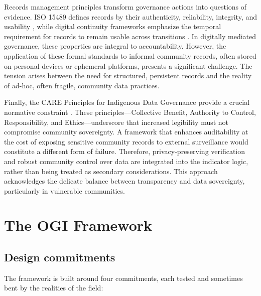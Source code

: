 \documentclass[sigconf,anonymous]{acmart}
\begin{document}
Records management principles transform governance actions into questions of evidence. ISO 15489 defines records by their authenticity, reliability, integrity, and usability \cite{iso2016}, while digital continuity frameworks emphasize the temporal requirement for records to remain usable across transitions \cite{lemieux2016}. In digitally mediated governance, these properties are integral to accountability. However, the application of these formal standards to informal community records, often stored on personal devices or ephemeral platforms, presents a significant challenge. The tension arises between the need for structured, persistent records and the reality of ad-hoc, often fragile, community data practices.

Finally, the CARE Principles for Indigenous Data Governance provide a crucial normative constraint \cite{carroll2020}. These principles—Collective Benefit, Authority to Control, Responsibility, and Ethics—underscore that increased legibility must not compromise community sovereignty. A framework that enhances auditability at the cost of exposing sensitive community records to external surveillance would constitute a different form of failure. Therefore, privacy-preserving verification and robust community control over data are integrated into the indicator logic, rather than being treated as secondary considerations. This approach acknowledges the delicate balance between transparency and data sovereignty, particularly in vulnerable communities.

\section{The OGI Framework}

\subsection{Design commitments}

The framework is built around four commitments, each tested and sometimes bent by the realities of the field:
\end{document}
